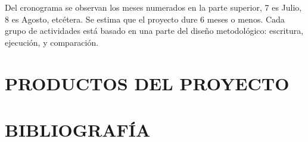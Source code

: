 \documentclass{article}
\begin{document}
Del cronograma se observan los meses numerados en la parte superior, 7 es Julio,
8 es Agosto, etcétera. Se estima que el proyecto dure 6 meses o menos. Cada grupo
de actividades está basado en una parte del diseño metodológico: escritura,
ejecución, y comparación.

\section{PRODUCTOS DEL PROYECTO}



\section{BIBLIOGRAFÍA}

\printbibliography[heading=none]
\end{document}
